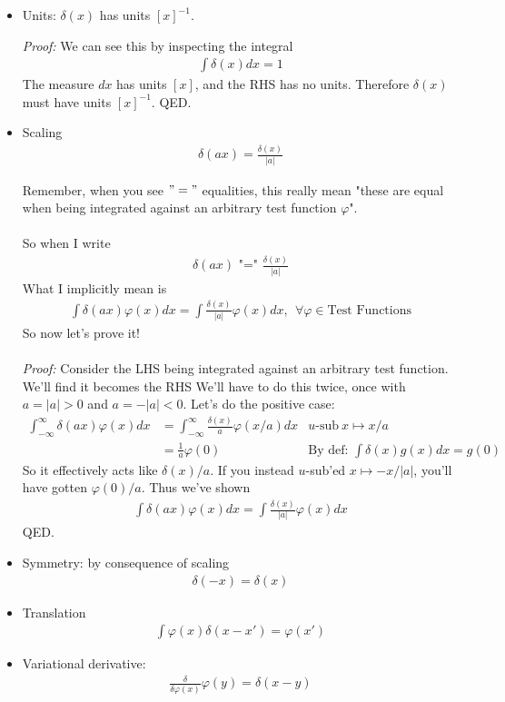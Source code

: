 \documentclass[12pt,fleqn]{article}
\numberwithin{equation}{section} %
\begin{document}
\begin{itemize}
	\item Units: $\delta(x)$ has units $[x]^{-1}$.
	\begin{sidework}
		\emph{Proof:} We can see this by inspecting the integral
		\begin{align}
			\int \delta(x) dx = 1
		\end{align}
		The measure $dx$ has units $[x]$, and the RHS has no units. Therefore $\delta(x)$ must have units $[x]^{-1}$. QED.
	\end{sidework}
	\item Scaling
		\begin{align}
			\delta(a x) = \frac{\delta(x)}{|a|}
		\end{align}
		\begin{sidework}
	Remember, when you see $"="$ equalities, this really mean 
	"these are equal when being integrated against an arbitrary test function $\varphi$".\\
	\\
	So when I write
	\begin{align}
		\delta(a x) \text{ "=" } \frac{\delta(x)}{|a|}
	\end{align}
	What I implicitly mean is
	\begin{align}
		\int \delta(a x) \varphi(x) dx = \int \frac{\delta(x)}{|a|} \varphi(x) dx, ~~\forall \varphi \in \text{Test Functions}
	\end{align} So now let's prove it!\\
	\\
	\emph{Proof:} Consider the LHS being integrated against an arbitrary test function. We'll find it becomes the RHS We'll have to do this twice, once with $a = |a| > 0$ and $a = -|a| < 0$. Let's do the positive case:
	\begin{align}
		\int_{-\infty}^\infty \delta (ax) \varphi (x) dx & = \int_{-\infty}^\infty \frac{\delta(x)}{a} \varphi(x/a) dx  & u\text{-sub}~ x \mapsto x/a\\
		& = \frac{1}{a} \varphi(0) & \text{By def: }\int \delta(x) g(x) dx = g(0)
	\end{align}
	So it effectively acts like $\delta(x)/a$. If you instead $u$-sub'ed $x\mapsto - x /|a|$, you'll have gotten $\varphi(0) / a$. Thus we've shown
	\begin{align}
		\int \delta(ax) \varphi(x) dx = \int \frac{\delta(x)}{|a|} \varphi(x) dx
	\end{align} QED.
\end{sidework}
	\item Symmetry: by consequence of scaling
		\begin{align}
			\delta(-x) = \delta(x)
		\end{align}
	\item Translation
		\begin{align}
			\int \varphi(x) \delta(x- x') = \varphi(x')
		\end{align} 
	\item Variational derivative:
	\begin{align}
		\frac{\delta}{\delta \varphi(x)} \varphi(y) = \delta(x-y)
	\end{align}
\end{itemize}
\end{document}
